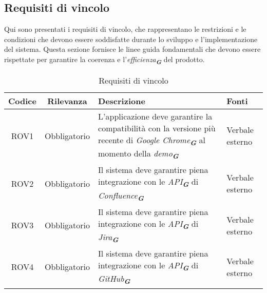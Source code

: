 \subsection{Requisiti di vincolo}
\label{sec:req_vincolo}
Qui sono presentati i requisiti di vincolo, che rappresentano le restrizioni e le condizioni
che devono essere soddisfatte durante lo sviluppo e l'implementazione del sistema. Questa
sezione fornisce le linee guida fondamentali che devono essere rispettate per garantire la
coerenza e l'\emph{efficienza}\textsubscript{\textit{\textbf{G}}} del prodotto.
\begin{table}[h!]
    \centering
    \renewcommand{\arraystretch}{1.6} %
    \begin{tabularx}{\textwidth}{|>{\centering\arraybackslash}c|>{\centering\arraybackslash}c|>{\centering\arraybackslash}X|>{\centering\arraybackslash}p{3cm}|} \hline
    \rowcolor[HTML]{FFD700} 
    \textbf{Codice} & \textbf{Rilevanza} & \textbf{Descrizione} & \textbf{Fonti} \\ \hline
    ROV1 & Obbligatorio & L'applicazione deve garantire la compatibilità con la versione più recente di \emph{Google Chrome}\textsubscript{\textit{\textbf{G}}} al momento della \emph{demo}\textsubscript{\textit{\textbf{G}}} & Verbale esterno \\ \hline
    ROV2 & Obbligatorio & Il sistema deve garantire piena integrazione con le \emph{API}\textsubscript{\textit{\textbf{G}}} di \emph{Confluence}\textsubscript{\textit{\textbf{G}}} & Verbale esterno \\ \hline
    ROV3 & Obbligatorio & Il sistema deve garantire piena integrazione con le \emph{API}\textsubscript{\textit{\textbf{G}}} di \emph{Jira}\textsubscript{\textit{\textbf{G}}} & Verbale esterno\\ \hline
    ROV4 & Obbligatorio & Il sistema deve garantire piena integrazione con le \emph{API}\textsubscript{\textit{\textbf{G}}} di \emph{GitHub}\textsubscript{\textit{\textbf{G}}} & Verbale esterno \\ \hline
    \end{tabularx}
    \caption{Requisiti di vincolo}
    \label{tab:Requisiti_di_vincolo}
\end{table}

\newpage
